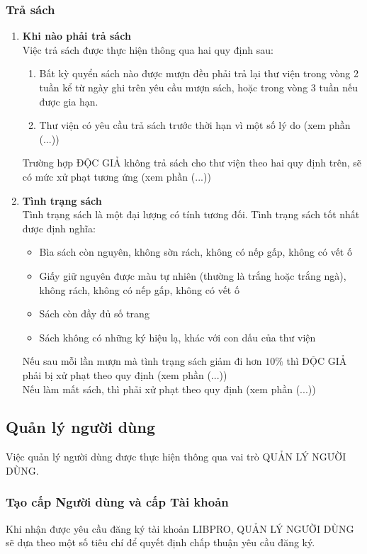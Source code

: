 \documentclass[12pt,a4paper]{report}
\begin{document}
			\subsubsection{Trả sách}
				\begin{enumerate}
				\item \textbf{Khi nào phải trả sách}\\
					Việc trả sách được thực hiện thông qua hai quy định sau:
					\begin{enumerate}
						\item Bất kỳ quyển sách nào được mượn đều phải trả lại thư viện trong vòng 2 tuần kể từ ngày ghi trên yêu cầu mượn sách, hoặc trong vòng 3 tuần nếu được gia hạn.\\
						\item Thư viện có yêu cầu trả sách trước thời hạn vì một số lý do (xem phần (...))
					\end{enumerate}
					Trường hợp ĐỘC GIẢ không trả sách cho thư viện theo hai quy định trên, sẽ có mức xử phạt tương ứng (xem phần (...))\\
				\item \textbf{Tình trạng sách}\\
					Tình trạng sách là một đại lượng có tính tương đối. Tình trạng sách tốt nhất được định nghĩa:
					\begin{itemize}
						\item Bìa sách còn nguyên, không sờn rách, không có nếp gấp, không có vết ố
						\item Giấy giữ nguyên được màu tự nhiên (thường là trắng hoặc trắng ngà), không rách, không có nếp gấp, không có vết ố
						\item Sách còn đầy đủ số trang
						\item Sách không có những ký hiệu lạ, khác với con dấu của thư viện
					\end{itemize}
					Nếu sau mỗi lần mượn mà tình trạng sách giảm đi hơn $10\%$ thì ĐỘC GIẢ phải bị xử phạt theo quy định (xem phần (...))\\
					Nếu làm mất sách, thì phải xử phạt theo quy định (xem phần (...))
				\end{enumerate}
		\subsection{Quản lý người dùng}
		Việc quản lý người dùng được thực hiện thông qua vai trò QUẢN LÝ NGƯỜI DÙNG.\\
			\subsubsection{Tạo cấp Người dùng và cấp Tài khoản}
			Khi nhận được yêu cầu đăng ký tài khoản LIBPRO, QUẢN LÝ NGƯỜI DÙNG sẽ dựa theo một số tiêu chí để quyết định chấp thuận yêu cầu đăng ký.\\
\end{document}
